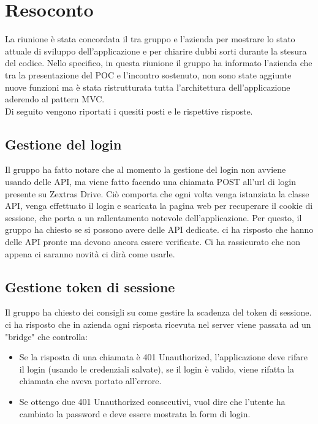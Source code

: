 \section{Resoconto}

La riunione è stata concordata il tra gruppo \textit{\Gruppo{}} e l'azienda per mostrare lo stato attuale di sviluppo dell'applicazione e per chiarire dubbi sorti durante la stesura del codice.
Nello specifico, in questa riunione il gruppo ha informato l'azienda che tra la presentazione del POC e l'incontro sostenuto, non sono state aggiunte nuove funzioni ma è stata ristrutturata tutta l'architettura dell'applicazione aderendo al pattern MVC. \\
Di seguito vengono riportati i quesiti posti e le rispettive risposte.

\subsection{Gestione del login}
Il gruppo ha fatto notare che al momento la gestione del login non avviene usando delle API, ma viene fatto facendo una chiamata POST all'url di login presente su Zextras Drive.
Ciò comporta che ogni volta venga istanziata la classe API, venga effettuato il login e scaricata la pagina web per recuperare il cookie di sessione, che porta a un rallentamento notevole dell'applicazione. Per questo, il gruppo ha chiesto se si possono avere delle API dedicate. \Federico{} ci ha risposto che hanno delle API pronte ma devono ancora essere verificate. Ci ha rassicurato che non appena ci saranno novità ci dirà come usarle.

\subsection{Gestione token di sessione}
Il gruppo ha chiesto dei consigli su come gestire la scadenza del token di sessione. \Alessio{} ci ha risposto che in azienda ogni risposta ricevuta nel server viene passata ad un "bridge" che controlla:
\begin{itemize}
    \item Se la risposta di una chiamata è 401 Unauthorized, l'applicazione deve rifare il login (usando le credenziali salvate), se il login è valido, viene rifatta la chiamata che aveva portato all'errore.
    \item Se ottengo due 401 Unauthorized consecutivi, vuol dire che l'utente ha cambiato la password e deve essere mostrata la form di login.
\end{itemize}

